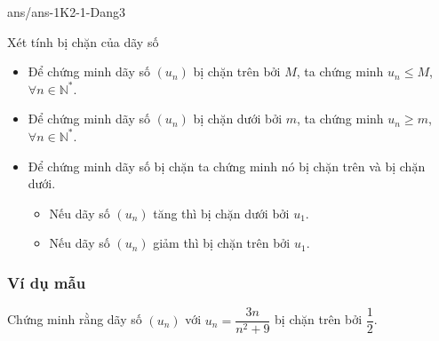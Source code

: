 \begin{indapan}{10}
	{ans/ans-1K2-1-Dang3}
\end{indapan}

\begin{dang}{Xét tính bị chặn của dãy số}
	\begin{itemize}
		\item Để chứng minh dãy số $(u_n)$ bị chặn trên bởi $M$, ta chứng minh $u_n\le M$, $\forall n\in\mathbb{N}^\ast$.
		\item Để chứng minh dãy số $(u_n)$ bị chặn dưới bởi $m$, ta chứng minh $u_n\ge m$, $\forall n\in\mathbb{N}^\ast$.
		\item Để chứng minh dãy số bị chặn ta chứng minh nó bị chặn trên và bị chặn dưới.
		\begin{itemize}
			\item Nếu dãy số $(u_n)$ tăng thì bị chặn dưới bởi $u_1$.
			\item Nếu dãy số $(u_n)$ giảm thì bị chặn trên bởi $u_1$.
		\end{itemize}
	\end{itemize}
\end{dang}
\subsubsection{Ví dụ mẫu}

\begin{vd}[NB]%
	Chứng minh rằng dãy số $(u_n)$ với $u_n=\dfrac{3n}{n^2+9}$ bị chặn trên bởi $\dfrac{1}{2}$.
\end{vd}

